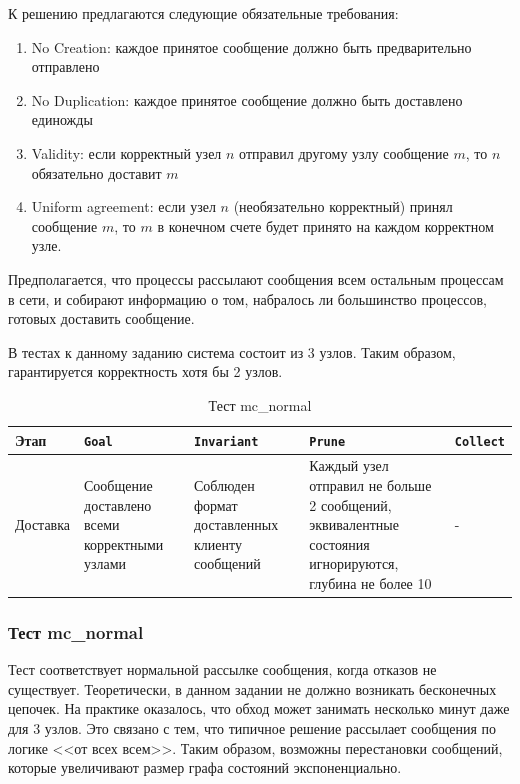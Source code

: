 \documentclass[a4paper,12pt]{extarticle}
\newcommand{\goal}[0]{\texttt{Goal}}
\newcommand{\prune}[0]{\texttt{Prune}}
\newcommand{\invariant}[0]{\texttt{Invariant}}
\newcommand{\collect}[0]{\texttt{Collect}}
\begin{document}
К решению предлагаются следующие обязательные требования:

\begin{enumerate}
\item No Creation: каждое принятое сообщение должно быть предварительно отправлено 
\item No Duplication: каждое принятое сообщение должно быть доставлено единожды
\item Validity: если корректный узел $n$ отправил другому узлу сообщение $m$, то $n$ обязательно доставит $m$
\item Uniform agreement: если узел $n$ (необязательно корректный) принял сообщение $m$, то $m$ в конечном счете будет принято на каждом корректном узле.
\end{enumerate}

Предполагается, что процессы рассылают сообщения всем остальным процессам в сети, и собирают информацию о том, набралось ли большинство процессов, готовых доставить сообщение.

В тестах к данному заданию система состоит из 3 узлов.
Таким образом, гарантируется корректность хотя бы 2 узлов.


\begin{table}[htbp]
    \caption{Тест mc\_normal}
    \begin{center}
    \begin{tabular}{|p{}|p{}|p{}|p{}|p{} |}
    \hline
    Этап & \goal & \invariant & \prune & \collect \\
    \hline
    Доставка & Сообщение доставлено всеми корректными узлами & Соблюден формат доставленных клиенту сообщений & Каждый узел отправил не больше 2 сообщений, эквивалентные состояния игнорируются, глубина не более 10 & - \\
    \hline    
    \end{tabular}
    \label{testsbroadcast_1}
    \end{center}
\end{table}

\subsubsection{Тест mc\_normal}

Тест соответствует нормальной рассылке сообщения, когда отказов не существует.
Теоретически, в данном задании не должно возникать бесконечных цепочек.
На практике оказалось, что обход может занимать несколько минут даже для 3 узлов.
Это связано с тем, что типичное решение рассылает сообщения по логике <<от всех всем>>.
Таким образом, возможны перестановки сообщений, которые увеличивают размер графа состояний экспоненциально.
\end{document}
